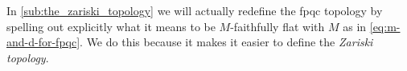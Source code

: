         In \cref{sub:the_zariski_topology} we will actually redefine the fpqc topology by spelling out explicitly what it means to be $M$-faithfully flat with $M$ as in \cref{eq:m-and-d-for-fpqc}.
        We do this because it makes it easier to define the \emph{Zariski topology}.
    

